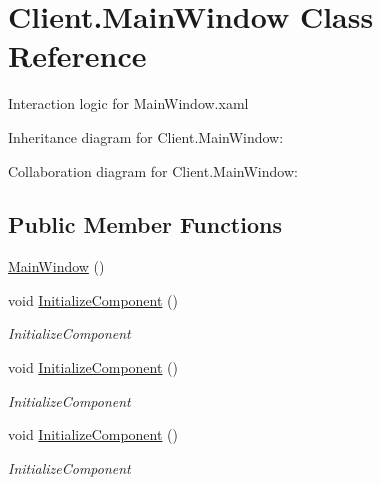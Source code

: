 \hypertarget{class_client_1_1_main_window}{}\section{Client.\+Main\+Window Class Reference}
\label{class_client_1_1_main_window}


Interaction logic for Main\+Window.\+xaml  




Inheritance diagram for Client.\+Main\+Window\+:


Collaboration diagram for Client.\+Main\+Window\+:
\subsection*{Public Member Functions}
\begin{DoxyCompactItemize}
\item 
\hyperlink{class_client_1_1_main_window_ae7c58513aeb07a9645724b1215a8c4c7}{Main\+Window} ()
\item 
void \hyperlink{class_client_1_1_main_window_a13154f295003703f3da565f38915a536}{Initialize\+Component} ()
\begin{DoxyCompactList}\small\item\em Initialize\+Component \end{DoxyCompactList}\item 
void \hyperlink{class_client_1_1_main_window_a13154f295003703f3da565f38915a536}{Initialize\+Component} ()
\begin{DoxyCompactList}\small\item\em Initialize\+Component \end{DoxyCompactList}\item 
void \hyperlink{class_client_1_1_main_window_a13154f295003703f3da565f38915a536}{Initialize\+Component} ()
\begin{DoxyCompactList}\small\item\em Initialize\+Component \end{DoxyCompactList}\end{DoxyCompactItemize}
